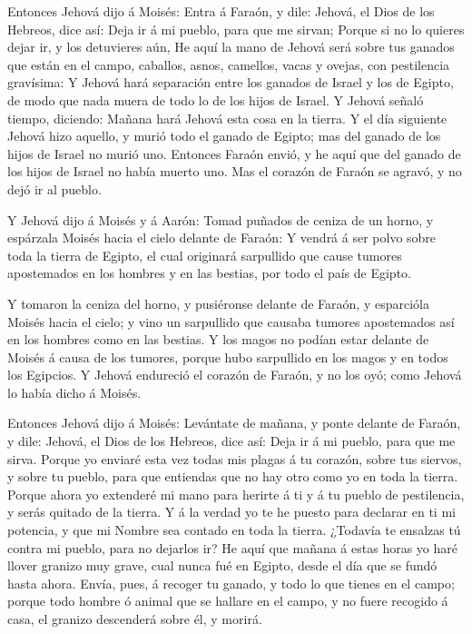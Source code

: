  Entonces Jehová dijo á Moisés: Entra á Faraón, y dile:
Jehová, el Dios de los Hebreos, dice así: Deja ir á mi pueblo, para que
me sirvan;  Porque si no lo quieres dejar ir, y los
detuvieres aún,  He aquí la mano de Jehová será sobre tus
ganados que están en el campo, caballos, asnos, camellos, vacas y
ovejas, con pestilencia gravísima:  Y Jehová hará separación
entre los ganados de Israel y los de Egipto, de modo que nada muera de
todo lo de los hijos de Israel.  Y Jehová señaló tiempo,
diciendo: Mañana hará Jehová esta cosa en la tierra.  Y el
día siguiente Jehová hizo aquello, y murió todo el ganado de Egipto; mas
del ganado de los hijos de Israel no murió uno.  Entonces
Faraón envió, y he aquí que del ganado de los hijos de Israel no había
muerto uno. Mas el corazón de Faraón se agravó, y no dejó ir al pueblo.

 Y Jehová dijo á Moisés y á Aarón: Tomad puñados de ceniza
de un horno, y espárzala Moisés hacia el cielo delante de Faraón:
 Y vendrá á ser polvo sobre toda la tierra de Egipto, el
cual originará sarpullido que cause tumores apostemados en los hombres y
en las bestias, por todo el país de Egipto.

 Y tomaron la ceniza del horno, y pusiéronse delante de
Faraón, y esparcióla Moisés hacia el cielo; y vino un sarpullido que
causaba tumores apostemados así en los hombres como en las bestias.
 Y los magos no podían estar delante de Moisés á causa de
los tumores, porque hubo sarpullido en los magos y en todos los
Egipcios.  Y Jehová endureció el corazón de Faraón, y no
los oyó; como Jehová lo había dicho á Moisés.

 Entonces Jehová dijo á Moisés: Levántate de mañana, y
ponte delante de Faraón, y dile: Jehová, el Dios de los Hebreos, dice
así: Deja ir á mi pueblo, para que me sirva.  Porque yo
enviaré esta vez todas mis plagas á tu corazón, sobre tus siervos, y
sobre tu pueblo, para que entiendas que no hay otro como yo en toda la
tierra.  Porque ahora yo extenderé mi mano para herirte á
ti y á tu pueblo de pestilencia, y serás quitado de la tierra.
 Y á la verdad yo te he puesto para declarar en ti mi
potencia, y que mi Nombre sea contado en toda la tierra. 
¿Todavía te ensalzas tú contra mi pueblo, para no dejarlos ir?
 He aquí que mañana á estas horas yo haré llover granizo
muy grave, cual nunca fué en Egipto, desde el día que se fundó hasta
ahora.  Envía, pues, á recoger tu ganado, y todo lo que
tienes en el campo; porque todo hombre ó animal que se hallare en el
campo, y no fuere recogido á casa, el granizo descenderá sobre él, y
morirá.

